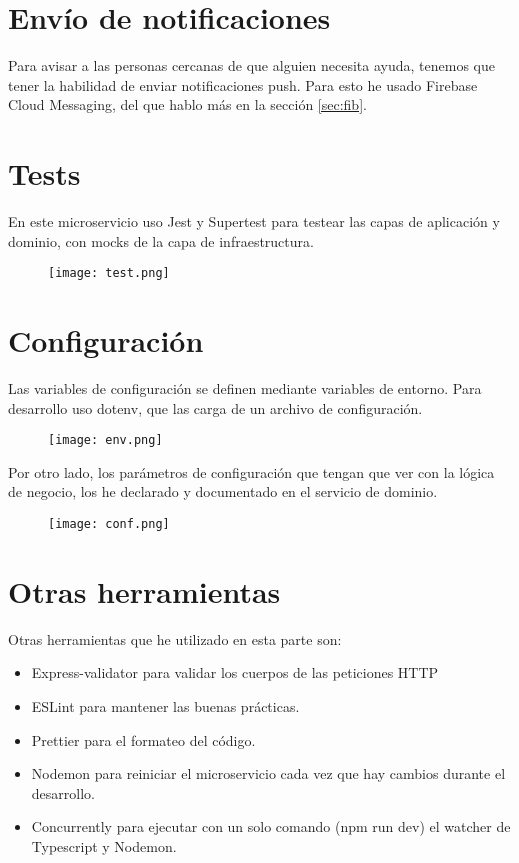 \section{Envío de notificaciones}
Para avisar a las personas cercanas de que alguien necesita ayuda, tenemos que tener la habilidad de enviar
notificaciones push. Para esto he usado Firebase Cloud Messaging, del que hablo más en la sección \ref{sec:fib}.

\section{Tests}\label{sec:tests}
En este microservicio uso Jest y Supertest para testear las capas de aplicación y dominio, con mocks de la capa de infraestructura.
\begin{figure}[H]
	\centering	
	\texttt{[image: test.png]}
	\end{figure}

\section{Configuración}\label{sec:config}
Las variables de configuración se definen mediante variables de entorno. Para desarrollo uso dotenv, 
que las carga de un archivo de configuración.
\begin{figure}[H]
	\centering	
	\texttt{[image: env.png]}
	\end{figure}

	Por otro lado, los parámetros de configuración que tengan que ver con la lógica
	de negocio, los he declarado y documentado en el servicio de dominio.

\begin{figure}[H]
	\centering	
	\texttt{[image: conf.png]}
	\end{figure}



\section{Otras herramientas}\label{sec:tools}
Otras herramientas que he utilizado en esta parte son:
\begin{itemize}
	\item Express-validator para validar los cuerpos de las peticiones HTTP
	\item ESLint para mantener las buenas prácticas.
	\item Prettier para el formateo del código.
	\item Nodemon para reiniciar el microservicio cada vez que hay cambios durante el desarrollo.
	\item Concurrently para ejecutar con un solo comando (npm run dev) el watcher de Typescript y Nodemon.
\end{itemize}
